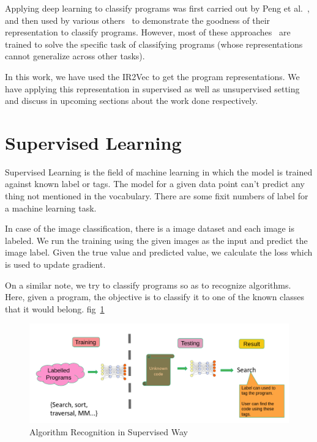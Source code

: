 Applying deep learning to classify programs was first carried out by Peng et al.~\cite{Peng:2015}, and then used by various others~\cite{tbcnn-aaai16,ncc,Chen:2019} to demonstrate the goodness of their representation to classify programs. 
However, most of these approaches~\cite{Peng:2015,tbcnn-aaai16,Chen:2019} are trained to solve the specific task of classifying programs (whose representations cannot generalize across other tasks).

In this work, we have used the IR2Vec to get the program representations. We have applying this representation in supervised as well as unsupervised setting and discuss in upcoming sections about the work done respectively.

\section{Supervised Learning}\label{sec:algo:sup}
Supervised Learning is the field of machine learning in which the model is trained against known label or tags. The model for a given data point can't predict any thing not mentioned in the vocabulary. There are some fixit numbers of label for a machine learning task.

In case of the image classification, there is a image dataset and each image is labeled. We run the training using the given images as the input and predict the image label. Given the true value and predicted value, we calculate the loss which is used to update gradient.

On a similar note, we try to classify programs so as to recognize algorithms. Here, given a program, the objective is to classify it to one of the known classes that it would belong. fig~\ref{fig:supervised-background}

\begin{figure}[t]
    \centering
    \includegraphics[scale=0.4]{figures/chapter-3/supervised_introduction.png}
    \caption{Algorithm Recognition in Supervised Way}
     \label{fig:supervised-background}
\end{figure}

